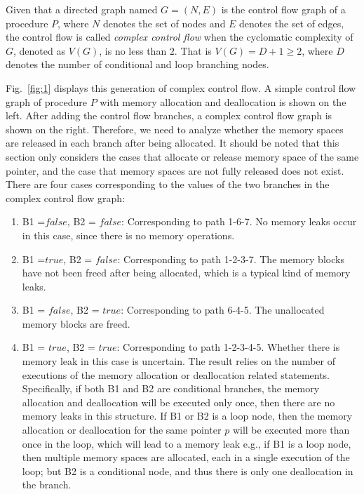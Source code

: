 \begin{definition}
Given that a directed graph named $G= (N, E)$ is the control flow graph of a procedure $P$, where $N$ denotes the set of nodes and $E$ denotes the set of edges, the control flow is called \emph{complex control flow} when the cyclomatic complexity of $G$, denoted as $V(G)$, is no less than $2$. That is $V(G)=D+1\geq 2$, where $D$ denotes the number of conditional and loop branching nodes.
\end{definition} 

Fig.~\ref{fig:1} displays this generation of complex control flow. A simple control flow graph of procedure $P$ with memory allocation and deallocation is shown on the left. After adding the control flow branches, a complex control flow graph is shown on the right. Therefore, we need to analyze whether the memory spaces are released in each branch after being allocated. It should be noted that this section only considers the cases that allocate or release memory space of the same pointer, and the case that memory spaces are not fully released does not exist. There are four cases corresponding to the values of the two branches in the complex control flow graph:
\begin{enumerate}
\item
B1 =$\mathit{false}$, B2 = $\mathit{false}$: Corresponding to path 1-6-7. No memory leaks occur in this case, since there is no memory operations.
\item
B1 =$\mathit{true}$, B2 = $\mathit{false}$: Corresponding to path 1-2-3-7. The memory blocks have not been freed after being allocated, which is a typical kind of memory leaks.
\item 
B1 = $\mathit{false}$, B2 = $\mathit{true}$: Corresponding to path 6-4-5. The unallocated memory blocks are freed.
\item
B1 = $\mathit{true}$, B2 = $\mathit{true}$: Corresponding to path 1-2-3-4-5. Whether there is memory leak in this case is uncertain. The result relies on the number of executions of the memory allocation or deallocation related statements. Specifically, if both B1 and B2 are conditional branches, the memory allocation and deallocation will be executed only once, then there are no memory leaks in this structure. If B1 or B2 is a loop node, then the memory allocation or deallocation for the same pointer $p$ will be executed more than once in the loop, which will lead to a memory leak e.g., if B1 is a loop node, then multiple memory spaces are allocated, each in a single execution of the loop; but B2 is a conditional node, and thus there is only one deallocation in the branch. %
\end{enumerate}

